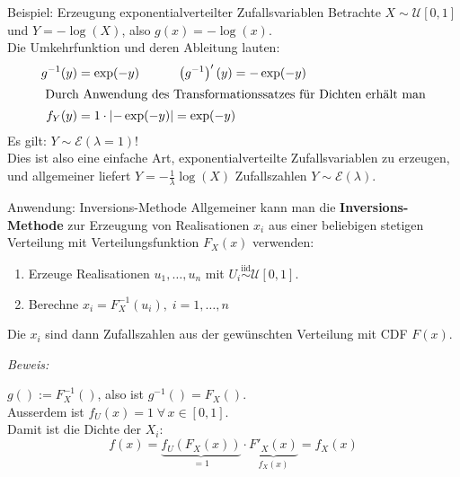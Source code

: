 \documentclass[
  10pt,
  ignorenonframetext,
]{beamer}
\providecommand{\tightlist}{%
  \setlength{\itemsep}{0pt}\setlength{\parskip}{0pt}}
\begin{document}
\begin{frame}{Beispiel: Erzeugung exponentialverteilter
Zufallsvariablen}
\label{beispiel-erzeugung-exponentialverteilter-zufallsvariablen}
Betrachte \(X \sim \mathcal{U}[0, 1]\) und \(Y = -\log(X)\), also
\(g(x) = -\log(x)\).\\
Die Umkehrfunktion und deren Ableitung lauten: \begin{align*}
g^{-1}(y) &= \exp(-y) \qquad\quad \left(g^{-1}\right)'(y) = -\exp(-y) \\
\intertext{
Durch Anwendung des Transformationssatzes für Dichten erhält man}
f_Y(y) &= 1 \cdot \left| -\exp(-y) \right| = \exp(-y)
\end{align*} Es gilt: \(Y \sim {\mathcal E}(\lambda = 1)\)!\\
Dies ist also eine einfache Art, exponentialverteilte Zufallsvariablen
zu erzeugen, und allgemeiner liefert \(Y = -\frac{1}{\lambda} \log(X)\)
Zufallszahlen \(Y \sim {\mathcal E}(\lambda)\).

\end{frame}

\begin{frame}{Anwendung: Inversions-Methode}
\label{anwendung-inversions-methode}
Allgemeiner kann man die \textbf{Inversions-Methode} zur Erzeugung von
Realisationen \(x_i\) aus einer beliebigen stetigen Verteilung mit
Verteilungsfunktion \(F_X(x)\) verwenden:

\begin{enumerate}
\tightlist
\item
  Erzeuge Realisationen \(u_1, \dots, u_n\) mit
  \(U_i \stackrel{\text{iid}}{\sim}\mathcal{U}[0,1]\).\\
\item
  Berechne \(x_i = F_X^{-1}(u_i), \; i=1, \dots, n\)
\end{enumerate}

Die \(x_i\) sind dann Zufallszahlen aus der gewünschten Verteilung mit
CDF \(F(x)\).

\emph{Beweis:}

\(g() := F_X^{-1}()\), also ist \(g^{-1}() = F_X()\).\\
Ausserdem ist \(f_U(x) = 1 \;\forall\, x \in [0, 1].\)\\
Damit ist die Dichte der \(X_i\): \[
f(x) = \underbrace{f_U(F_X(x))}_{=1} \cdot
\underbrace{F'_X(x)}_{f_X(x)} = f_X(x)
\]
\end{frame}
\end{document}
